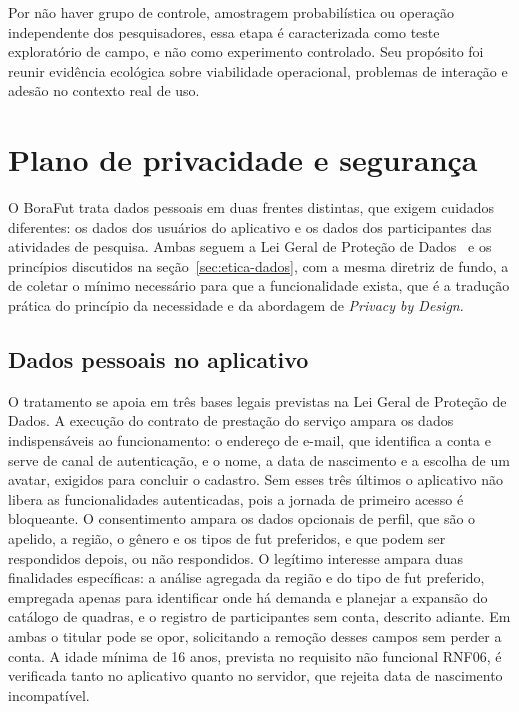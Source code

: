         Por não haver grupo de controle, amostragem probabilística ou operação independente dos pesquisadores, essa etapa é caracterizada como teste exploratório de campo, e não como experimento controlado. Seu propósito foi reunir evidência ecológica sobre viabilidade operacional, problemas de interação e adesão no contexto real de uso.

\section{Plano de privacidade e segurança}
    \label{sec:privacidade}

    O BoraFut trata dados pessoais em duas frentes distintas, que exigem cuidados diferentes: os dados dos usuários do aplicativo e os dados dos participantes das atividades de pesquisa. Ambas seguem a Lei Geral de Proteção de Dados~\cite{LGPD2018} e os princípios discutidos na seção~\ref{sec:etica-dados}, com a mesma diretriz de fundo, a de coletar o mínimo necessário para que a funcionalidade exista, que é a tradução prática do princípio da necessidade e da abordagem de \textit{Privacy by Design}.

    \subsection{Dados pessoais no aplicativo}
        O tratamento se apoia em três bases legais previstas na Lei Geral de Proteção de Dados. A execução do contrato de prestação do serviço ampara os dados indispensáveis ao funcionamento: o endereço de e-mail, que identifica a conta e serve de canal de autenticação, e o nome, a data de nascimento e a escolha de um avatar, exigidos para concluir o cadastro. Sem esses três últimos o aplicativo não libera as funcionalidades autenticadas, pois a jornada de primeiro acesso é bloqueante. O consentimento ampara os dados opcionais de perfil, que são o apelido, a região, o gênero e os tipos de fut preferidos, e que podem ser respondidos depois, ou não respondidos. O legítimo interesse ampara duas finalidades específicas: a análise agregada da região e do tipo de fut preferido, empregada apenas para identificar onde há demanda e planejar a expansão do catálogo de quadras, e o registro de participantes sem conta, descrito adiante. Em ambas o titular pode se opor, solicitando a remoção desses campos sem perder a conta. A idade mínima de 16 anos, prevista no requisito não funcional RNF06, é verificada tanto no aplicativo quanto no servidor, que rejeita data de nascimento incompatível.

